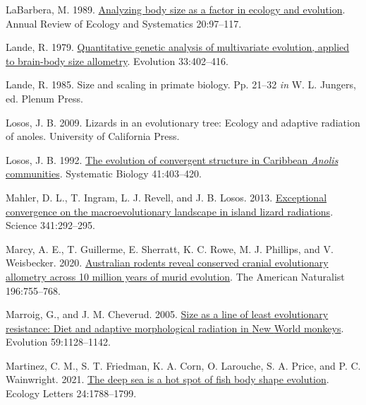\documentclass[
  11pt,
]{article}
\newlength{\cslhangindent}
\newlength{\cslentryspacingunit} %
\newenvironment{CSLReferences}[2] %
 {%
  \setlength{\parindent}{0pt}
  \ifodd #1
  \let\oldpar\par
  \def\par{\hangindent=\cslhangindent\oldpar}
  \fi
  \setlength{\parskip}{#2\cslentryspacingunit}
 }%
 {}
\begin{document}
\begin{CSLReferences}{1}{0}
\leavevmode{}%
LaBarbera, M. 1989.
\href{https://doi.org/10.1146/annurev.es.20.110189.000525}{Analyzing
body size as a factor in ecology and evolution}. Annual Review of
Ecology and Systematics 20:97--117.

\leavevmode{}%
Lande, R. 1979. \href{https://doi.org/10.2307/2407630}{Quantitative
genetic analysis of multivariate evolution, applied to brain-body size
allometry}. Evolution 33:402--416.

\leavevmode{}%
Lande, R. 1985. Size and scaling in primate biology. Pp. 21--32
\emph{in} W. L. Jungers, ed. Plenum Press.

\leavevmode{}%
Losos, J. B. 2009. Lizards in an evolutionary tree: Ecology and adaptive
radiation of anoles. University of California Press.

\leavevmode{}%
Losos, J. B. 1992. \href{https://doi.org/10.1093/sysbio/41.4.403}{The
evolution of convergent structure in {C}aribbean \emph{{A}nolis}
communities}. Systematic Biology 41:403--420.

\leavevmode{}%
Mahler, D. L., T. Ingram, L. J. Revell, and J. B. Losos. 2013.
\href{https://doi.org/10.1126/science.1232392}{Exceptional convergence
on the macroevolutionary landscape in island lizard radiations}. Science
341:292--295.

\leavevmode{}%
Marcy, A. E., T. Guillerme, E. Sherratt, K. C. Rowe, M. J. Phillips, and
V. Weisbecker. 2020. \href{https://doi.org/10.1086/711398}{Australian
rodents reveal conserved cranial evolutionary allometry across 10
million years of murid evolution}. The American Naturalist 196:755--768.

\leavevmode{}%
Marroig, G., and J. M. Cheverud. 2005.
\href{https://doi.org/10.1111/j.0014-3820.2005.tb01049.x}{Size as a line
of least evolutionary resistance: Diet and adaptive morphological
radiation in {N}ew {W}orld monkeys}. Evolution 59:1128--1142.

\leavevmode{}%
Martinez, C. M., S. T. Friedman, K. A. Corn, O. Larouche, S. A. Price,
and P. C. Wainwright. 2021. \href{https://doi.org/10.1111/ele.13785}{The
deep sea is a hot spot of fish body shape evolution}. Ecology Letters
24:1788--1799.


\end{CSLReferences}
\end{document}
